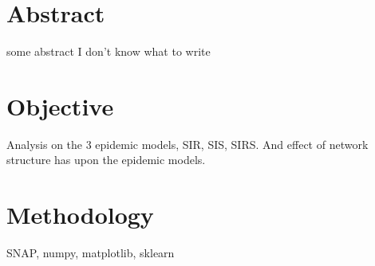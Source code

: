 \documentclass{subfiles}
\begin{document}
  \section{Abstract}
  some abstract I don't know what to write
  \section{Objective}
  Analysis on the 3 epidemic models, SIR, SIS, SIRS. And effect of network structure has upon the epidemic models.
  \section{Methodology}
  SNAP, numpy, matplotlib, sklearn
\end{document}
